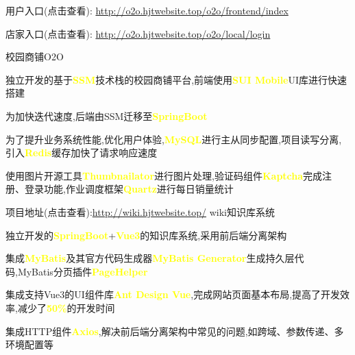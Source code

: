 
\begin{cventries}
	
	\cventry
	{用户入口(点击查看): \url{http://o2o.hjtwebsite.top/o2o/frontend/index} \item 
		店家入口(点击查看): \url{http://o2o.hjtwebsite.top/o2o/local/login}} %
	{校园商铺O2O} %
	{} %
	{} %
	{
		\begin{cvitems} %
			\item {独立开发的基于\textcolor{yellow}{\textbf{SSM}}技术栈的校园商铺平台,前端使用\textcolor{yellow}{\textbf{SUI Mobile}}UI库进行快速搭建}
			\item {为加快迭代速度,后端由SSM迁移至\textcolor{yellow}{\textbf{SpringBoot}}}
			\item {为了提升业务系统性能,优化用户体验,\textcolor{yellow}{\textbf{MySQL}}进行主从同步配置,项目读写分离,引入\textcolor{yellow}{\textbf{Redis}}缓存加快了请求响应速度}
			\item {使用图片开源工具\textcolor{yellow}{\textbf{Thumbnailator}}进行图片处理,验证码组件\textcolor{yellow}{\textbf{Kaptcha}}完成注册、登录功能,作业调度框架\textcolor{yellow}{\textbf{Quartz}}进行每日销量统计}
		\end{cvitems}
	}
	\cventry
	{项目地址(点击查看):\url{http://wiki.hjtwebsite.top/}} %
	{wiki知识库系统} %
	{} %
	{} %
	{
		\begin{cvitems} %
			\item {独立开发的\textcolor{yellow}{\textbf{SpringBoot}}+\textcolor{yellow}{\textbf{Vue3}}的知识库系统,采用前后端分离架构}
			\item {集成\textcolor{yellow}{\textbf{MyBatis}}及其官方代码生成器\textcolor{yellow}{\textbf{MyBatis Generator}}生成持久层代码,MyBatis分页插件\textcolor{yellow}{\textbf{PageHelper}}}
			\item {集成支持Vue3的UI组件库\textcolor{yellow}{\textbf{Ant Design Vue}},完成网站页面基本布局,提高了开发效率,减少了\textcolor{yellow}{\textbf{50\%}}的开发时间}
			\item {集成HTTP组件\textcolor{yellow}{\textbf{Axios}},解决前后端分离架构中常见的问题,如跨域、参数传递、多环境配置等}

\end{cvitems}}
\end{cventries}
